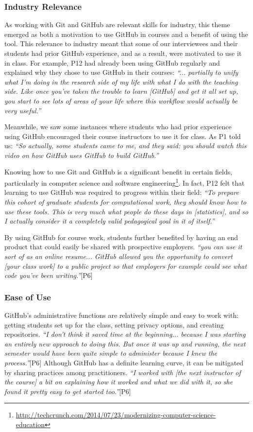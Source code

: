 \subsubsection{Industry Relevance}
As working with Git and GitHub are relevant skills for industry, this theme emerged as both a motivation to use GitHub in courses and a benefit of using the tool. This relevance to industry meant that some of our interviewees and their students had prior GitHub experience, and as a result, were motivated to use it in class. For example, P12 had already been using GitHub regularly and explained why they chose to use GitHub in their courses: \textit{``... partially to unify what I'm doing in the research side of my life with what I do with the teaching side. Like once you've taken the trouble to learn [GitHub] and get it all set up, you start to see lots of areas of your life where this workflow would actually be very useful.''}

Meanwhile, we saw some instances where students who had prior experience using GitHub encouraged their course instructors to use it for class. As P1 told us: \textit{``So actually, some students came to me, and they said: you should watch this video on how GitHub uses GitHub to build GitHub.''}

Knowing how to use Git and GitHub is a significant benefit in certain fields, particularly in computer science and software engineering\footnote{\url{http://techcrunch.com/2014/07/23/modernizing-computer-science-education}}. In fact, P12 felt that learning to use GitHub was required to progress within their field: \textit{``To prepare this cohort of graduate students for computational work, they should know how to use these tools. This is very much what people do these days in [statistics], and so I actually consider it a completely valid pedagogical goal in it of itself.''}

By using GitHub for course work, students further benefited by having an end product that could easily be shared with prospective employers. \textit{``you can use it sort of as an online resume... GitHub allowed you the opportunity to convert [your class work] to a public project so that employers for example could see what code you've been writing.''}[P6]

\subsubsection{Ease of Use}
GitHub's administrative functions are relatively simple and easy to work with: getting students set up for the class, setting privacy options, and creating repositories. \textit{``I don't think it saved time at the beginning... because I was starting an entirely new approach to doing this. But once it was up and running, the next semester would have been quite simple to administer because I knew the process.''}[P6] Although GitHub has a definite learning curve, it can be mitigated by sharing practices among practitioners. \textit{``I worked with [the next instructor of the course] a bit on explaining how it worked and what we did with it, so she found it pretty easy to get started too.''}[P6]

